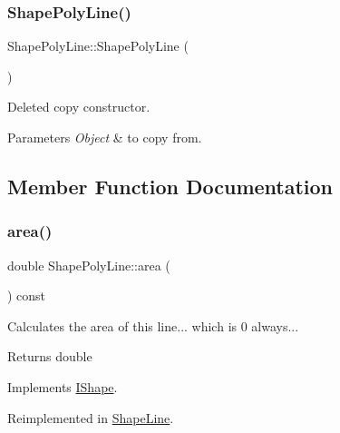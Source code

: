 \subsubsection{\texorpdfstring{ShapePolyLine()}{ShapePolyLine()}\hspace{0.1cm}{\footnotesize\ttfamily [2/2]}}
{\footnotesize\ttfamily Shape\+Poly\+Line\+::\+Shape\+Poly\+Line (\begin{DoxyParamCaption}\item[{const \mbox{\hyperlink{class_shape_poly_line}{Shape\+Poly\+Line}} \&}]{ }\end{DoxyParamCaption})\hspace{0.3cm}{\ttfamily [delete]}}



Deleted copy constructor. 


\begin{DoxyParams}{Parameters}
{\em Object} & to copy from. \\
\hline
\end{DoxyParams}


\subsection{Member Function Documentation}
\mbox{\label{class_shape_poly_line_ace9d3c1eefec00364034dc420262c91e}} 
\subsubsection{\texorpdfstring{area()}{area()}}
{\footnotesize\ttfamily double Shape\+Poly\+Line\+::area (\begin{DoxyParamCaption}{ }\end{DoxyParamCaption}) const\hspace{0.3cm}{\ttfamily [virtual]}}



Calculates the area of this line... which is 0 always... 

\begin{DoxyReturn}{Returns}
double 
\end{DoxyReturn}


Implements \mbox{\hyperlink{class_i_shape_aed742a160acdd13c9cfdeb16e605afea}{I\+Shape}}.



Reimplemented in \mbox{\hyperlink{class_shape_line_a6f33bdd78706ad73e570b4ba53bbc00b}{Shape\+Line}}.

